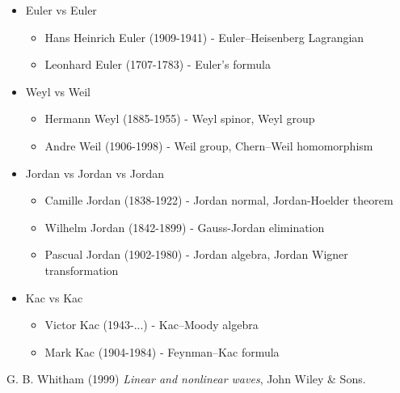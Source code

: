 \documentclass[10pt,a4paper]{book}
\theoremstyle{definition}
\begin{document}
\begin{itemize}
\item Euler vs Euler
    \begin{itemize}
    \item {\sc Hans Heinrich Euler} (1909-1941) - Euler–Heisenberg Lagrangian
    \item {\sc Leonhard Euler} (1707-1783) - Euler's formula
    \end{itemize}
\item Weyl vs Weil
    \begin{itemize}
    \item {\sc Hermann Weyl} (1885-1955) - Weyl spinor, Weyl group
    \item {\sc Andre Weil} (1906-1998) - Weil group, Chern–Weil homomorphism
    \end{itemize}
\item Jordan vs Jordan vs Jordan
    \begin{itemize}
    \item {\sc Camille Jordan} (1838-1922) - Jordan normal, Jordan-Hoelder theorem
    \item {\sc Wilhelm Jordan} (1842-1899) - Gauss-Jordan elimination
    \item {\sc Pascual Jordan} (1902-1980) - Jordan algebra, Jordan Wigner transformation
    \end{itemize}
\item Kac vs Kac
    \begin{itemize}
    \item {\sc Victor Kac} (1943-...) - Kac–Moody algebra
    \item {\sc Mark Kac} (1904-1984) - Feynman–Kac formula
    \end{itemize}
\end{itemize}

\begin{thebibliography}{9}
G. B. Whitham (1999) \emph{Linear and nonlinear waves}, John Wiley \& Sons.
\end{thebibliography}
\end{document}
